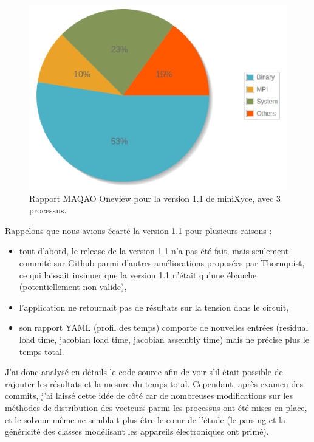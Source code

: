 \documentclass[11pt,a4paper,oneside]{memoir}
\theoremstyle{definition}
\theoremstyle{remark}
\theoremstyle{plain}
\begin{document}
\begin{figure}
\begin{center}
\includegraphics[scale=0.5]{Images-Rapport/maqao_minixyce_1.1_3proc.png}
\caption{Rapport MAQAO Oneview pour la version 1.1 de miniXyce, avec 3 processus.}
\label{maqao_minixyce_1.1}
\end{center}
\end{figure}

Rappelons que nous avions écarté la version 1.1 pour plusieurs raisons :
\begin{itemize}
\item tout d'abord, le release de la version 1.1 n'a pas été fait, mais seulement commité sur Github parmi d'autres améliorations proposées par Thornquist, ce qui laissait insinuer que la version 1.1 n'était qu'une ébauche (potentiellement non valide),
\item l'application ne retournait pas de résultats sur la tension dans le circuit,
\item son rapport YAML (profil des temps) comporte de nouvelles entrées (residual load time, jacobian load time, jacobian assembly time) mais ne précise plus le temps total.
\end{itemize}

J'ai donc analysé en détails le code source afin de voir s'il était possible de rajouter les résultats et la mesure du temps total. Cependant, après examen des commits, j'ai laissé cette idée de côté car de nombreuses modifications sur les méthodes de distribution des vecteurs parmi les processus ont été mises en place, et le solveur même ne semblait plus être le cœur de l'étude (le parsing et la généricité des classes modélisant les appareils électroniques ont primé).
\end{document}
